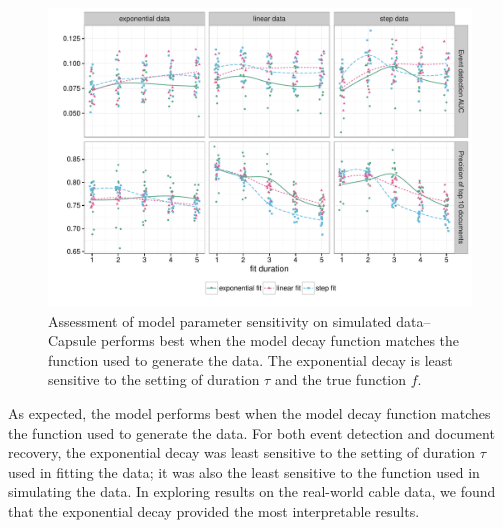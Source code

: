 \begin{figure}[th]
\centering
\includegraphics[width=\linewidth]{fig/sim_sensitivity.pdf}
\caption{Assessment of model parameter sensitivity on simulated data--Capsule performs best when the model decay function matches the function used to generate the data.   The exponential decay is least sensitive to the setting of duration $\tau$ and the true function $f$.}
\label{fig:sensitivity}
\end{figure}

As expected, the model performs best when the model decay function matches the function used to generate the data.   For both event detection and document recovery, the exponential decay was least sensitive to the setting of duration $\tau$ used in fitting the data; it was also the least sensitive to the function used in simulating the data.  In exploring results on the real-world cable data, we found that the exponential decay provided the most interpretable results.











